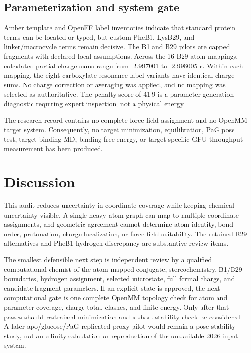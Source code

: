 \documentclass[11pt]{article}
\begin{document}
\subsection{Parameterization and system gate}

Amber template and OpenFF label inventories indicate that standard protein terms can be located or typed, but custom PheB1, LysB29, and linker/macrocycle terms remain decisive. The B1 and B29 pilots are capped fragments with declared local assumptions. Across the 16 B29 atom mappings, calculated partial-charge sums range from -2.997001 to -2.996005 e. Within each mapping, the eight carboxylate resonance label variants have identical charge sums. No charge correction or averaging was applied, and no mapping was selected as authoritative. The penalty score of 41.9 is a parameter-generation diagnostic requiring expert inspection, not a physical energy.

The research record contains no complete force-field assignment and no OpenMM target system. Consequently, no target minimization, equilibration, PaG pose test, target-binding MD, binding free energy, or target-specific GPU throughput measurement has been produced.

\section{Discussion}

This audit reduces uncertainty in coordinate coverage while keeping chemical uncertainty visible. A single heavy-atom graph can map to multiple coordinate assignments, and geometric agreement cannot determine atom identity, bond order, protonation, charge localization, or force-field suitability. The retained B29 alternatives and PheB1 hydrogen discrepancy are substantive review items.

The smallest defensible next step is independent review by a qualified computational chemist of the atom-mapped conjugate, stereochemistry, B1/B29 boundaries, hydrogen assignment, selected microstate, full formal charge, and candidate fragment parameters. If an explicit state is approved, the next computational gate is one complete OpenMM topology check for atom and parameter coverage, charge total, clashes, and finite energy. Only after that passes should restrained minimization and a short stability check be considered. A later apo/glucose/PaG replicated proxy pilot would remain a pose-stability study, not an affinity calculation or reproduction of the unavailable 2026 input system.
\end{document}
